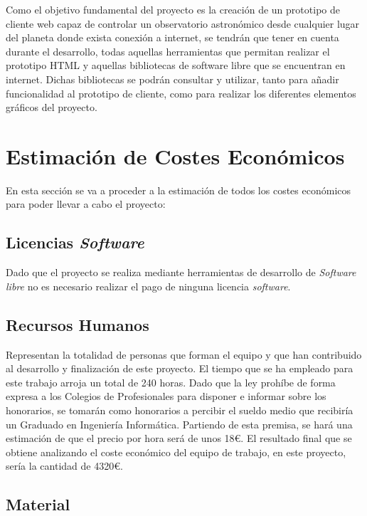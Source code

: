 Como el objetivo fundamental del proyecto es la creación de un prototipo de cliente web capaz de controlar un observatorio astronómico desde cualquier lugar del planeta donde exista conexión a internet, se tendrán que tener en cuenta durante el desarrollo, todas aquellas herramientas que permitan realizar el prototipo HTML y aquellas bibliotecas de software libre que se encuentran en internet. Dichas bibliotecas se podrán consultar y utilizar, tanto para añadir funcionalidad al prototipo de cliente, como para realizar los diferentes elementos gráficos del proyecto.

\section{Estimación de Costes Económicos}
En esta sección se va a proceder a la estimación de todos los costes económicos para poder llevar a cabo el proyecto:

\subsection{Licencias \textit{Software}}
Dado que el proyecto se realiza mediante herramientas de desarrollo de \textit{Software libre} no es necesario realizar el pago de ninguna licencia \textit{software}.

\subsection{Recursos Humanos}
Representan la totalidad de personas que forman el equipo y que han contribuido al desarrollo y finalización de este proyecto. El tiempo que se ha empleado para este trabajo arroja un total de 240 horas. Dado que la ley prohíbe de forma expresa a los Colegios de Profesionales para disponer e informar sobre los honorarios, se tomarán como honorarios a percibir el sueldo medio que recibiría un Graduado en Ingeniería Informática. Partiendo de esta premisa, se hará una estimación de que el precio por hora será de unos 18€. El resultado final que se obtiene analizando el coste económico del equipo de trabajo, en este proyecto, sería la cantidad de 4320€.

\subsection{Material}
